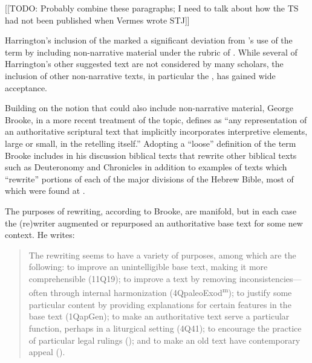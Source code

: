 [[TODO: Probably combine these paragraphs; I need to talk about how the TS had not been published when Vermes wrote STJ]]

 Harrington's inclusion of the \templescroll marked a significant deviation from \vermes's use of the term by including non-narrative material under the rubric of \rwb. While several of Harrington's other suggested text are not considered \rwb by many scholars, the inclusion of other non-narrative texts, in particular the \templescroll, has gained wide acceptance.\autocite{bernstein_textus2005} 

 Building on the notion that \rwb could also include non-narrative material, George Brooke, in a more recent treatment of the topic, defines \rwb as ``any representation of an authoritative scriptural text that implicitly incorporates interpretive elements, large or small, in the retelling itself.''\autocite[777]{brooke_schiffman-vanderkam2000} Adopting a ``loose'' definition of the term Brooke includes in his discussion biblical texts that rewrite other biblical texts such as Deuteronomy and Chronicles in addition to examples of texts which ``rewrite'' portions of each of the major divisions of the Hebrew Bible, most of which were found at \qumran.\autocites[Brooke categorizes the texts as follows: Reworked Pentateuchs, Rewritten Pentateuchal narratives, Rewritten Pentateuchal laws, Rewritten Former Prophets, Rewritten Latter Prophets, and Rewritten Writings.][778--780]{brooke_schiffman-vanderkam2000}[See also][]{brooke_herbert-tov2002} 

 The purposes of rewriting, according to Brooke, are manifold, but in each case the (re)writer augmented or repurposed an authoritative base text for some new context. He writes: 

 \begin{quote} The rewriting seems to have a variety of purposes, among which are the following: to improve an unintelligible base text, making it more comprehensible (11Q19); to improve a text by removing inconsistencies---often through internal harmonization (4QpaleoExod\textsuperscript{m}); to justify some particular content by providing explanations for certain features in the base text (1QapGen); to make an authoritative text serve a particular function, perhaps in a liturgical setting (4Q41); to encourage the practice of particular legal rulings (\jub); and to make an old text have contemporary appeal (\templescroll).\autocite[778]{brooke_schiffman-vanderkam2000} \end{quote} 

